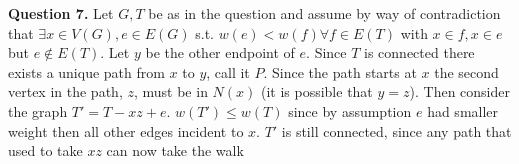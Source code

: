 \documentclass[letterpaper, reqno,11pt]{article}
\begin{document}
{\medskip\noindent\bf Question 7.} Let $G, T$ be as in the question and assume by way of contradiction that $\exists x\in V(G), e\in E(G)$ s.t. $w(e)<w(f)\forall f\in E(T)$ with $x\in f, x\in e$ but $e \not\in E(T)$. Let $y$ be the other endpoint of $e$. Since $T$ is connected there exists a unique path from $x$ to $y$, call it $P$. Since the path starts at $x$ the second vertex in the path, $z$, must be in $N(x)$ (it is possible that $y=z$). Then consider the graph $T'=T-xz+e$. $w(T')\leq w(T)$ since by assumption $e$ had smaller weight then all other edges incident to $x$. $T'$ is still connected, since any path that used to take $xz$ can now take the walk
\end{document}
